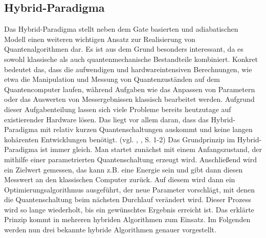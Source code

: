 \subsection{Hybrid-Paradigma}
Das Hybrid-Paradigma stellt neben dem Gate basierten und adiabatischen Modell einen weiteren wichtigen Ansatz zur Realisierung von Quantenalgorithmen dar. Es ist aus dem Grund besonders interessant, da es sowohl klassische als auch quantenmechanische Bestandteile kombiniert. Konkret bedeutet das, dass die aufwendigen und hardwareintensiven Berechnungen, wie etwa die Manipulation und Messung von Quantenzuständen auf dem Quantencomputer laufen, während Aufgaben wie das Anpassen von Parametern oder das Auswerten von Messergebnissen klassisch bearbeitet werden. Aufgrund dieser Aufgabenteilung lassen sich viele Probleme bereits heutzutage auf existierender Hardware lösen. Das liegt vor allem daran, dass das Hybrid-Paradigma mit relativ kurzen Quantenschaltungen auskommt und keine langen kohärenten Entwicklungen benötigt.
(vgl. \citeauthor{cerezo_variational_nodate}, \citeyear{cerezo_variational_nodate}, S. 1-2)
Das Grundprinzip im Hybrid-Paradigma ist immer gleich. Man startet zunächst mit einem Anfangszustand, der mithilfe einer parametrierten Quantenschaltung erzeugt wird. Anschließend wird ein Zielwert gemessen, das kann z.B. eine Energie sein und gibt dann diesen Messwert an den klassischen Computer zurück. Auf diesem wird dann ein Optimierungsalgorithmus ausgeführt, der neue Parameter vorschlägt, mit denen die Quantenschaltung beim nächsten Durchlauf verändert wird. Dieser Prozess wird so lange wiederholt, bis ein gewünschtes Ergebnis erreicht ist. Das erklärte Prinzip kommt in mehreren hybriden Algorithmen zum Einsatz. Im Folgenden werden nun drei bekannte hybride Algorithmen genauer vorgestellt. 
